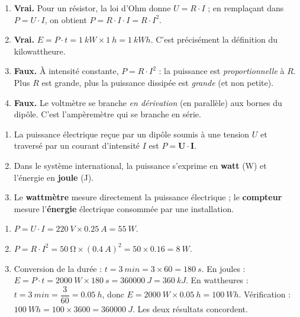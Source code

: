 \documentclass[11pt]{article}
\begin{document}
\begin{corrige}
\begin{enumerate}
\item \textbf{Vrai.} Pour un résistor, la loi d'Ohm donne $U = R \cdot I$ ; en remplaçant dans $P = U \cdot I$, on obtient $P = R \cdot I \cdot I = R \cdot I^2$.
\item \textbf{Vrai.} $E = P \cdot t = \SI{1}{kW} \times \SI{1}{h} = \SI{1}{kWh}$. C'est précisément la définition du kilowattheure.
\item \textbf{Faux.} À intensité constante, $P = R \cdot I^2$ : la puissance est \emph{proportionnelle} à $R$. Plus $R$ est grande, plus la puissance dissipée est \emph{grande} (et non petite).
\item \textbf{Faux.} Le voltmètre se branche \emph{en dérivation} (en parallèle) aux bornes du dipôle. C'est l'ampèremètre qui se branche en série.
\end{enumerate}
\end{corrige}

\begin{corrige}
\begin{enumerate}
\item La puissance électrique reçue par un dipôle soumis à une tension $U$ et traversé par un courant d'intensité $I$ est $P = \mathbf{U \cdot I}$.
\item Dans le système international, la puissance s'exprime en \textbf{watt} (\si{\watt}) et l'énergie en \textbf{joule} (\si{\joule}).
\item Le \textbf{wattmètre} mesure directement la puissance électrique ; le \textbf{compteur} mesure l'\textbf{énergie} électrique consommée par une installation.
\end{enumerate}
\end{corrige}

\begin{corrige}
\begin{enumerate}
\item $P = U \cdot I = \SI{220}{V} \times \SI{0,25}{A} = \SI{55}{W}$.
\item $P = R \cdot I^2 = \SI{50}{\ohm} \times (\SI{0,4}{A})^2 = 50 \times \num{0,16} = \SI{8}{W}$.
\item Conversion de la durée : $t = \SI{3}{min} = 3 \times 60 = \SI{180}{s}$.
En joules : $E = P \cdot t = \SI{2000}{W} \times \SI{180}{s} = \SI{360000}{J} = \SI{360}{kJ}$.
En wattheures : $t = \SI{3}{min} = \dfrac{3}{60} = \SI{0,05}{h}$, donc $E = \SI{2000}{W} \times \SI{0,05}{h} = \SI{100}{Wh}$.
Vérification : $\SI{100}{Wh} = 100 \times 3600 = \SI{360000}{J}$. Les deux résultats concordent.
\end{enumerate}
\end{corrige}
\end{document}
